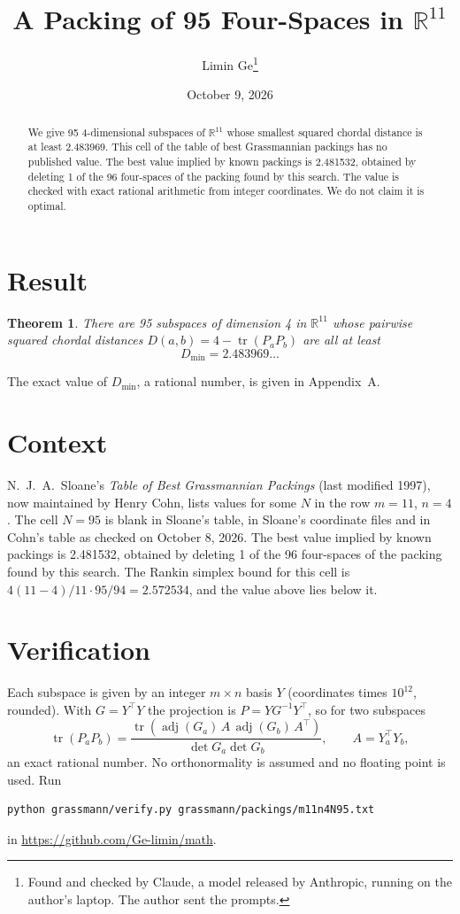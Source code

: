 \documentclass[11pt,a4paper]{article}
\title{A Packing of 95 Four-Spaces in $\mathbb{R}^{11}$}
\author{Limin Ge\thanks{Found and checked by Claude, a model released by Anthropic, running on the author's laptop. The author sent the prompts.}}
\date{October 9, 2026}
\newtheorem*{theorem}{Theorem}
\begin{document}
\maketitle
\begin{abstract}
We give 95 4-dimensional subspaces of $\mathbb{R}^{11}$ whose smallest squared chordal distance is at least 2.483969. This cell of the table of best Grassmannian packings has no published value. The best value implied by known packings is 2.481532, obtained by deleting 1 of the 96 four-spaces of the packing found by this search. The value is checked with exact rational arithmetic from integer coordinates. We do not claim it is optimal.
\end{abstract}

\section{Result}
\begin{theorem}
There are 95 subspaces of dimension 4 in $\mathbb{R}^{11}$ whose pairwise squared chordal distances $D(a,b) = 4 - \operatorname{tr}(P_aP_b)$ are all at least
\[ D_{\min} = 2.483969\ldots \]
\end{theorem}
The exact value of $D_{\min}$, a rational number, is given in Appendix~A.


\section{Context}
N.~J.~A.~Sloane's \emph{Table of Best Grassmannian Packings} (last modified 1997), now maintained by Henry Cohn, lists values for some $N$ in the row $m=11$, $n=4$. The cell $N=95$ is blank in Sloane's table, in Sloane's coordinate files and in Cohn's table as checked on October 8, 2026. The best value implied by known packings is 2.481532, obtained by deleting 1 of the 96 four-spaces of the packing found by this search. The Rankin simplex bound for this cell is $4(11-4)/11\cdot 95/94 = 2.572534$, and the value above lies below it.


\section{Verification}
Each subspace is given by an integer $m\times n$ basis $Y$ (coordinates times $10^{12}$, rounded). With $G=Y^\top Y$ the projection is $P=YG^{-1}Y^\top$, so for two subspaces
\[ \operatorname{tr}(P_aP_b)=\frac{\operatorname{tr}(\operatorname{adj}(G_a)\,A\,\operatorname{adj}(G_b)\,A^\top)}{\det G_a\det G_b},\qquad A=Y_a^\top Y_b, \]
an exact rational number. No orthonormality is assumed and no floating point is used. Run
\begin{verbatim}
python grassmann/verify.py grassmann/packings/m11n4N95.txt
\end{verbatim}
in \url{https://github.com/Ge-limin/math}.
\end{document}
